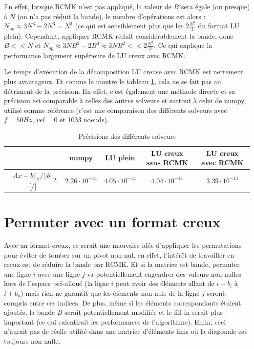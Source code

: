 \documentclass[11pt]{article}
\begin{document}
En effet, lorsque RCMK n'est pas appliqué, la valeur de $B$ sera égale (ou presque) à $N$ (on n'a pas réduit la bande), le nombre d'opérations est alors : $N_{op} \approx 3N^3 - 2N^3 = N^3$ (ce qui est sensiblement plus que les $2\frac{N^3}{3}$ du format LU plein). Cependant, appliquer RCMK réduit considérablement la bande, donc $B << N$ et $N_{op} \approx 3NB^2 - 2B^3 \approx 3NB^2 << 2\frac{N^3}{3}$. Ce qui explique la performance largement supérieure de LU creux avec RCMK. \\
\vspace{-8pt}

Le temps d'exécution de la décomposition LU creuse avec RCMK est nettement plus avantageux. Et comme le montre le tableau \ref{precisionsolveurs}, cela ne se fait pas au détriment de la précision. En effet, c'est également une méthode directe et sa précision est comparable à celles des autres solveurs et surtout à celui de numpy, utilisé comme référence (c'est une comparaison des différents solveurs avec $f = 50Hz$, $vel = 0$ et 1033 noeuds).
\begin{table}[]
    \centering
    \begin{tabular}{|c|c|c|c|c|}
        \hline
         &  numpy & LU plein & LU creux sans RCMK & LU creux avec RCMK\\
         \hline
         $||Ax - b||_2/||b||_2$ [/] & $2.26 \cdot 10^{-14}$ &  $4.05 \cdot 10^{-14}$ & $4.04 \cdot 10^{-14}$ & $3.39\cdot 10^{-14}$\\
         \hline
    \end{tabular}
    \caption{Précisions des différents solveurs}
    \label{precisionsolveurs}
\end{table}
\vspace{-12pt}

\section{Permuter avec un format creux}
\vspace{-10pt}
Avec un format creux, ce serait une mauvaise idée d'appliquer les permutations pour éviter de tomber sur un pivot non-nul, en effet, l'intérêt de travailler en creux est de réduire la bande par RCMK. Et si la matrice est bande, permuter une ligne $i$ avec une ligne $j$ va potentiellement engendrer des valeurs non-nulles hors de l'espace pré-alloué (la ligne $i$ peut avoir des éléments allant de $i - b_l$ à $i + b_u$) mais rien ne garantit que les éléments non-nuls de la ligne $j$ seront compris entre ces indices. De plus, même si les éléments correspondants étaient ajoutés, la bande $B$ serait potentiellement modifiée et le fill-in serait plus important (ce qui ralentirait les performances de l'algorithme). Enfin, ceci n'aurait pas de réelle utilité dans une matrice d'éléments finis où la diagonale est toujours non-nulle. 
\end{document}
